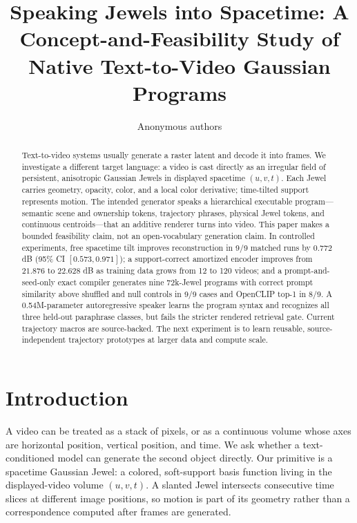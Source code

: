 \documentclass{article}
\title{Speaking Jewels into Spacetime: A Concept-and-Feasibility Study of\\Native Text-to-Video Gaussian Programs}
\author{Anonymous authors}
\newcommand{\uvt}{$(u,v,t)$}
\begin{document}
\maketitle

\begin{abstract}
Text-to-video systems usually generate a raster latent and decode it into frames. We investigate a
different target language: a video is cast directly as an irregular field of persistent,
anisotropic Gaussian Jewels in displayed spacetime $(u,v,t)$. Each Jewel carries geometry,
opacity, color, and a local color derivative; time-tilted support represents motion. The intended
generator speaks a hierarchical executable program---semantic scene and ownership tokens,
trajectory phrases, physical Jewel tokens, and continuous centroids---that an additive renderer
turns into video. This paper makes a bounded feasibility claim, not an open-vocabulary generation
claim. In controlled experiments, free spacetime tilt improves reconstruction in 9/9 matched runs
by $0.772$ dB (95\% CI $[0.573,0.971]$); a support-correct amortized encoder improves from $21.876$
to $22.628$ dB as training data grows from 12 to 120 videos; and a prompt-and-seed-only exact
compiler generates nine 72k-Jewel programs with correct prompt similarity above shuffled and null
controls in 9/9 cases and OpenCLIP top-1 in 8/9. A 0.54M-parameter autoregressive speaker learns the
program syntax and recognizes all three held-out paraphrase classes, but fails the stricter rendered
retrieval gate. Current trajectory macros are source-backed. The next experiment is to learn
reusable, source-independent trajectory prototypes at larger data and compute scale.
\end{abstract}

\section{Introduction}
\label{sec:intro}

A video can be treated as a stack of pixels, or as a continuous volume whose axes are horizontal
position, vertical position, and time. We ask whether a text-conditioned model can generate the
second object directly. Our primitive is a spacetime Gaussian Jewel: a colored, soft-support basis
function living in the displayed-video volume \uvt. A slanted Jewel intersects consecutive time
slices at different image positions, so motion is part of its geometry rather than a correspondence
computed after frames are generated.
\end{document}
